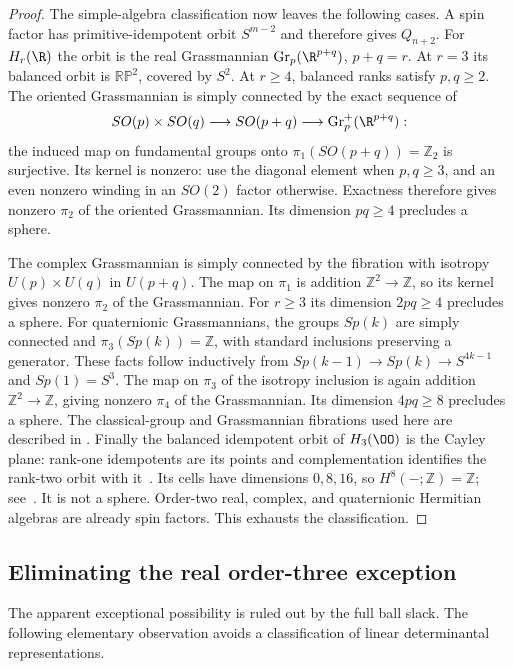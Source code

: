 \begin{proof}
The simple-algebra classification now leaves the following cases.
A spin factor has primitive-idempotent orbit $S^{m-2}$ and therefore gives
$Q_{n+2}$. For $H_r(\R)$ the orbit is the real Grassmannian
$\operatorname{Gr}_p(\R^{p+q})$, $p+q=r$. At $r=3$ its balanced orbit is
$\mathbb{RP}^2$, covered by $S^2$. At $r\geq4$, balanced ranks satisfy
$p,q\geq2$. The oriented Grassmannian is simply connected by the exact
sequence of
\[
 SO(p)\times SO(q)\longrightarrow SO(p+q)
 \longrightarrow\operatorname{Gr}_p^+(\R^{p+q}):
\]
the induced map on fundamental groups onto $\pi_1(SO(p+q))=\mathbb Z_2$
is surjective. Its kernel is nonzero: use the diagonal element when
$p,q\geq3$, and an even nonzero winding in an $SO(2)$ factor otherwise.
Exactness therefore gives nonzero $\pi_2$ of the oriented Grassmannian.
Its dimension $pq\geq4$ precludes a sphere.

The complex Grassmannian is simply connected by the fibration with
isotropy $U(p)\times U(q)$ in $U(p+q)$. The map on $\pi_1$ is addition
$\mathbb Z^2\to\mathbb Z$, so its kernel gives nonzero $\pi_2$ of the
Grassmannian. For $r\geq3$ its dimension $2pq\geq4$ precludes a sphere.
For quaternionic Grassmannians, the groups $Sp(k)$ are simply connected
and $\pi_3(Sp(k))=\mathbb Z$, with standard inclusions preserving a
generator. These facts follow inductively from
$Sp(k-1)\to Sp(k)\to S^{4k-1}$ and $Sp(1)=S^3$.
The map on $\pi_3$ of the isotropy inclusion is again addition
$\mathbb Z^2\to\mathbb Z$, giving nonzero $\pi_4$ of the Grassmannian.
Its dimension $4pq\geq8$ precludes a sphere. The classical-group and
Grassmannian fibrations used here are described in
\cite[Examples~4.53--4.55]{Hatcher2002}.
Finally the balanced idempotent orbit of $H_3(\OO)$ is the Cayley plane:
rank-one idempotents are its points and complementation identifies the
rank-two orbit with it~\cite[Section~3.4]{Baez2002}.
Its cells have dimensions $0,8,16$, so $H^8(-;\mathbb Z)=\mathbb Z$;
see~\cite[Example~4.47]{Hatcher2002}. It is not a sphere.
Order-two real, complex, and quaternionic Hermitian algebras are already
spin factors. This exhausts the classification.
\end{proof}

\subsection{Eliminating the real order-three exception}
The apparent exceptional possibility is ruled out by the full ball slack.
The following elementary observation avoids a classification of linear
determinantal representations.

